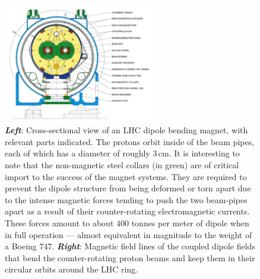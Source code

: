 \begin{figure}[!htb]
    \begin{center}
        \begin{minipage}{\textwidth}
        \includegraphics[width=0.59\textwidth]{figures/chapter2/lhc_dipole_fig3p3}
        \end{minipage}
        \caption{
            \textbf{\textit{Left}}: Cross-sectional view of an LHC dipole bending magnet, with relevant parts indicated.
            The protons orbit inside of the beam pipes, each of which has a diameter of roughly $3$\,cm.
            It is interesting to note that the non-magnetic steel collars (in green) are of critical import
            to the success of the magnet systems. They are required
            to prevent the dipole structure from being deformed or torn apart due to the intense magnetic forces
            tending to push the two beam-pipes apart as a result of their counter-rotating electromagnetic currents.
            These forces amount to about 400 tonnes per meter of dipole when in full operation --- almost equivalent in magnitude
            to the weight of a Boeing 747.
            \textbf{\textit{Right}}: Magnetic field lines of the coupled dipole fields that bend the counter-rotating proton beams
            and keep them in their circular orbits around the LHC ring.
        }
        \label{fig:lhc_dipole_xsec}
    \end{center}
\end{figure}


